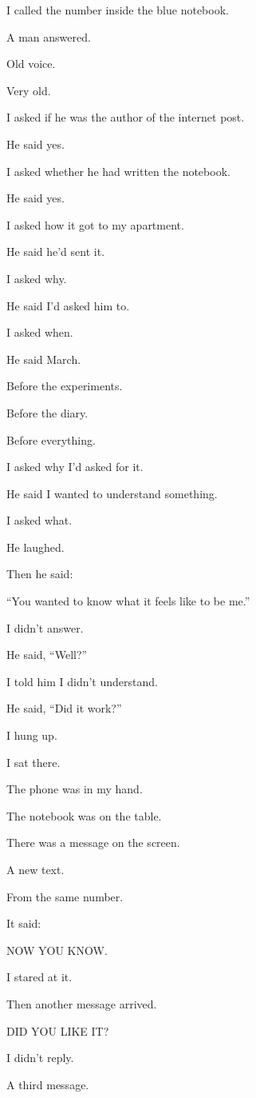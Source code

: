 \documentclass[11pt,oneside]{book}
\begin{document}
I called the number inside the blue notebook.

A man answered.

Old voice.

Very old.

I asked if he was the author of the internet post.

He said yes.

I asked whether he had written the notebook.

He said yes.

I asked how it got to my apartment.

He said he'd sent it.

I asked why.

He said I'd asked him to.

I asked when.

He said March.

Before the experiments.

Before the diary.

Before everything.

I asked why I'd asked for it.

He said I wanted to understand something.

I asked what.

He laughed.

Then he said:

``You wanted to know what it feels like to be me.''

I didn't answer.

He said, ``Well?''

I told him I didn't understand.

He said, ``Did it work?''

I hung up.

I sat there.

The phone was in my hand.

The notebook was on the table.

There was a message on the screen.

A new text.

From the same number.

It said:

NOW YOU KNOW.

I stared at it.

Then another message arrived.

DID YOU LIKE IT?

I didn't reply.

A third message.
\end{document}

